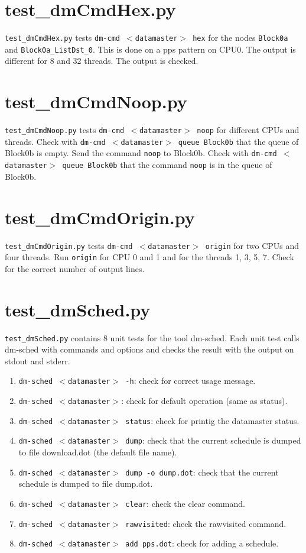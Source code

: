 \documentclass[12pt,a4paper]{report}
\begin{document}
\section{test\_dmCmdHex.py}
\texttt{test\_dmCmdHex.py} tests \texttt{dm-cmd $<$datamaster$>$ hex}
for the nodes \texttt{Block0a} and \texttt{Block0a\_ListDst\_0}. This
is done on a pps pattern on CPU0. The output is different for 8 and 32 threads.
The output is checked.

\section{test\_dmCmdNoop.py}
\texttt{test\_dmCmdNoop.py} tests \texttt{dm-cmd $<$datamaster$>$ noop} for different CPUs and threads.
Check with \texttt{dm-cmd $<$datamaster$>$ queue Block0b} that the queue of Block0b is empty.
Send the command \texttt{noop} to Block0b. Check with \texttt{dm-cmd $<$datamaster$>$ queue Block0b}
that the command \texttt{noop} is in the queue of Block0b.

\section{test\_dmCmdOrigin.py}
\texttt{test\_dmCmdOrigin.py} tests \texttt{dm-cmd $<$datamaster$>$ origin}
for two CPUs and four threads. Run \texttt{origin} for CPU 0 and 1 and for
the threads 1, 3, 5, 7. Check for the correct number of output lines.

\section{test\_dmSched.py}
\texttt{test\_dmSched.py} contains 8 unit tests for the tool dm-sched.
Each unit test calls dm-sched with commands and options and checks the
result with the output on stdout and stderr.

\begin{enumerate}
\item \texttt{dm-sched $<$datamaster$>$ -h}: check for correct usage message.
\item \texttt{dm-sched $<$datamaster$>$}: check for default operation (same as status).
\item \texttt{dm-sched $<$datamaster$>$ status}: check for printig the datamaster status.
\item \texttt{dm-sched $<$datamaster$>$ dump}: check that the current
schedule is dumped to file download.dot (the default file name).
\item \texttt{dm-sched $<$datamaster$>$ dump -o dump.dot}: check that
the current schedule is dumped to file dump.dot.
\item \texttt{dm-sched $<$datamaster$>$ clear}: check the clear command.
\item \texttt{dm-sched $<$datamaster$>$ rawvisited}: check the rawvisited command.
\item \texttt{dm-sched $<$datamaster$>$ add pps.dot}: check for adding a schedule.
\end{enumerate}
\end{document}
